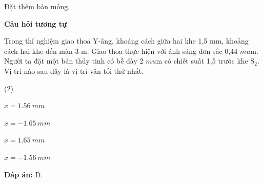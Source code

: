 \begin{dang}{Đặt thêm bản mỏng.}
{		\begin{center}
			\textbf{Câu hỏi tương tự}
		\end{center}
		
		Trong thí nghiệm giao thoa Y-âng, khoảng cách giữa hai khe 1,5 mm, khoảng cách hai khe đến màn 3 m. Giao thoa thực hiện với ánh sáng đơn sắc 0,44 $mu$m. Người ta đặt một bản thủy tinh có bề dày 2 $mu$m có chiết suất 1,5 trước khe $\text{S}_2$. Vị trí nào sau đây là vị trí vân tối thứ nhất.
		\begin{mcq}(2)
			\item $ x = \SI{+1,56}{mm} $		
			\item $ x = \SI{-1,65}{mm} $
			\item $ x = \SI{+1,65}{mm} $
			\item $ x = \SI{-1,56}{mm} $
		\end{mcq}
		
		\textbf{Đáp án:} D.
		
	}
	
\end{dang}